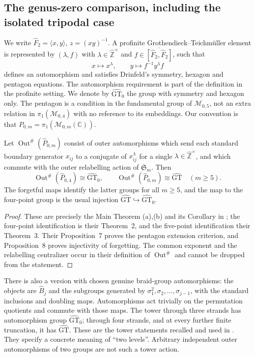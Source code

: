 \subsection{The genus-zero comparison, including the isolated tripodal case}

We write $\widehat F_2=\langle x,y\rangle$, $z=(xy)^{-1}$.  A profinite
Grothendieck--Teichm\"uller element is represented by $(\lambda,f)$ with
$\lambda\in\widehat{\mathbb Z}^{\times}$ and
$f\in\overline{[\widehat F_2,\widehat F_2]}$, such that
\[
 x\longmapsto x^\lambda,\qquad
 y\longmapsto f^{-1}y^\lambda f
\]
defines an automorphism and satisfies Drinfeld's symmetry, hexagon and
pentagon equations.  The automorphism requirement is part of the definition
in the profinite setting.  We denote by $\widehat{\mathrm{GT}}_0$ the group
with symmetry and hexagon only.  The pentagon is a condition in the
fundamental group of $\mathcal M_{0,5}$, not an extra relation in
$\pi_1(\mathcal M_{0,4})$ with no reference to its embeddings.  Our convention
is that $P_{0,m}=\pi_1(\mathcal M_{0,m}(\mathbb C))$.

Let $\operatorname{Out}^{\#}(\widehat P_{0,m})$ consist of outer
automorphisms which send each standard boundary generator $x_{ij}$ to a
conjugate of $x_{ij}^{\lambda}$ for a single
$\lambda\in\widehat{\mathbb Z}^{\times}$, and which commute with the
outer relabelling action of $\mathfrak S_m$.  Then
\[
 \operatorname{Out}^{\#}(\widehat P_{0,4})
       \cong\widehat{\mathrm{GT}}_0,
 \qquad
 \operatorname{Out}^{\#}(\widehat P_{0,m})
       \cong\widehat{\mathrm{GT}}\quad(m\geq5).
\]
The forgetful maps identify the latter groups for all $m\geq5$, and the
map to the four-point group is the usual injection
$\widehat{\mathrm{GT}}\hookrightarrow\widehat{\mathrm{GT}}_0$.
\begin{proof}
These are precisely the Main Theorem (a),(b) and its Corollary in
\citet{HarbaterSchneps2000}; the four-point identification is their
Theorem~2, and the five-point identification their Theorem~3.
Their Proposition~7 proves the pentagon extension criterion, and
Proposition~8 proves injectivity of forgetting.  The common exponent and
the relabelling centralizer occur in their definition of
$\operatorname{Out}^{\#}$ and cannot be dropped from the statement.
\end{proof}

There is also a version with chosen genuine braid-group automorphisms:
the objects are $\widehat B_j$ and the subgroups generated by
$\sigma_1^2,\sigma_2,\ldots,\sigma_{j-1}$, with the standard inclusions
and doubling maps.  Automorphisms act trivially on the permutation
quotients and commute with those maps.  The tower through three strands
has automorphism group $\widehat{\mathrm{GT}}_0$; through four strands,
and at every further finite truncation, it has
$\widehat{\mathrm{GT}}$.  These are the tower statements recalled and
used in \citet[\S0.3]{HarbaterSchneps2000}.  They specify a concrete
meaning of ``two levels''.  Arbitrary independent outer automorphisms of
two groups are not such a tower action.

